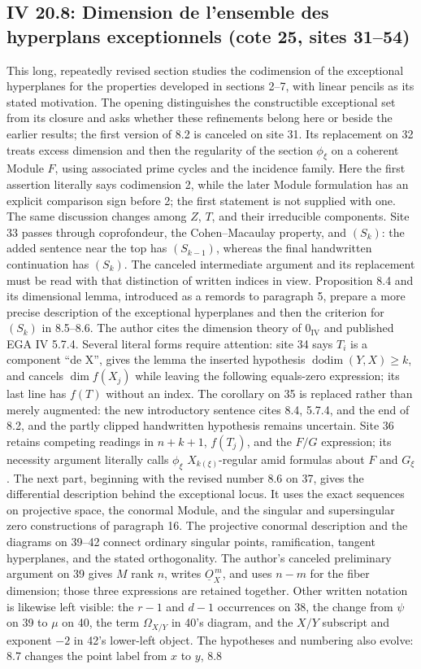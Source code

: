 \subsection*{IV 20.8: Dimension de l'ensemble des hyperplans exceptionnels (cote 25, sites 31--54)}
This long, repeatedly revised section studies the codimension of the exceptional hyperplanes for the properties developed in sections 2--7, with linear pencils as its stated motivation. The opening distinguishes the constructible exceptional set from its closure and asks whether these refinements belong here or beside the earlier results; the first version of 8.2 is canceled on site 31. Its replacement on 32 treats excess dimension and then the regularity of the section $\phi_\xi$ on a coherent Module $F$, using associated prime cycles and the incidence family. Here the first assertion literally says codimension 2, while the later Module formulation has an explicit comparison sign before 2; the first statement is not supplied with one. The same discussion changes among $Z$, $T$, and their irreducible components. Site 33 passes through coprofondeur, the Cohen--Macaulay property, and $(S_k)$: the added sentence near the top has $(S_{k-1})$, whereas the final handwritten continuation has $(S_k)$. The canceled intermediate argument and its replacement must be read with that distinction of written indices in view. Proposition 8.4 and its dimensional lemma, introduced as a remords to paragraph 5, prepare a more precise description of the exceptional hyperplanes and then the criterion for $(S_k)$ in 8.5--8.6. The author cites the dimension theory of $0_{\mathrm{IV}}$ and published EGA IV 5.7.4. Several literal forms require attention: site 34 says $T_i$ is a component ``de X'', gives the lemma the inserted hypothesis $\operatorname{dodim}(Y,X)\geq k$, and cancels $\dim f(X_j)$ while leaving the following equals-zero expression; its last line has $f(T)$ without an index. The corollary on 35 is replaced rather than merely augmented: the new introductory sentence cites 8.4, 5.7.4, and the end of 8.2, and the partly clipped handwritten hypothesis remains uncertain. Site 36 retains competing readings in $n+k+1$, $f(T_j)$, and the $F/G$ expression; its necessity argument literally calls $\phi_\xi$ $X_{k(\xi)}$-regular amid formulas about $F$ and $G_\xi$. The next part, beginning with the revised number 8.6 on 37, gives the differential description behind the exceptional locus. It uses the exact sequences on projective space, the conormal Module, and the singular and supersingular zero constructions of paragraph 16. The projective conormal description and the diagrams on 39--42 connect ordinary singular points, ramification, tangent hyperplanes, and the stated orthogonality. The author's canceled preliminary argument on 39 gives $M$ rank $n$, writes $\underline{O}_X^{\,m}$, and uses $n-m$ for the fiber dimension; those three expressions are retained together. Other written notation is likewise left visible: the $r-1$ and $d-1$ occurrences on 38, the change from $\psi$ on 39 to $\mu$ on 40, the term $\Omega_{X/Y}$ in 40's diagram, and the $X/Y$ subscript and exponent $-2$ in 42's lower-left object. The hypotheses and numbering also evolve: 8.7 changes the point label from $x$ to $y$, 8.8 
